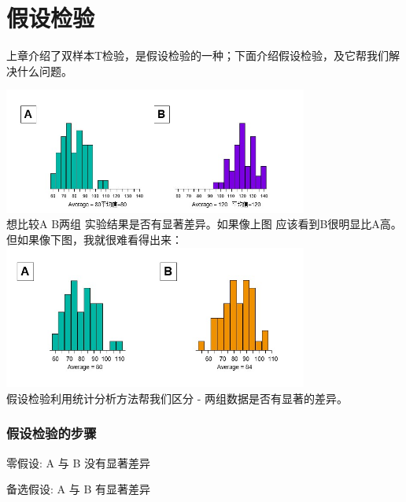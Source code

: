 \chapter{假设检验} %

上章介绍了双样本T检验，是假设检验的一种；下面介绍假设检验，及它帮我们解决什么问题。


\includegraphics[width=10cm]{CompareAB1Screenshot_2022-11-06_211947.jpg}\\

想比较A B两组 实验结果是否有显著差异。如果像上图
应该看到B很明显比A高。\\
但如果像下图，我就很难看得出来：\\


\includegraphics[width=10cm]{CompareAB2Screenshot_2022-11-06_212036.jpg}\\
假设检验利用统计分析方法帮我们区分 - 两组数据是否有显著的差异。

\hypertarget{ux5047ux8bbeux68c0ux9a8cux7684ux6b65ux9aa4}{%
\subsection{假设检验的步骤}\label{ux5047ux8bbeux68c0ux9a8cux7684ux6b65ux9aa4}}

零假设: A 与 B 没有显著差异

备选假设: A 与 B 有显著差异

